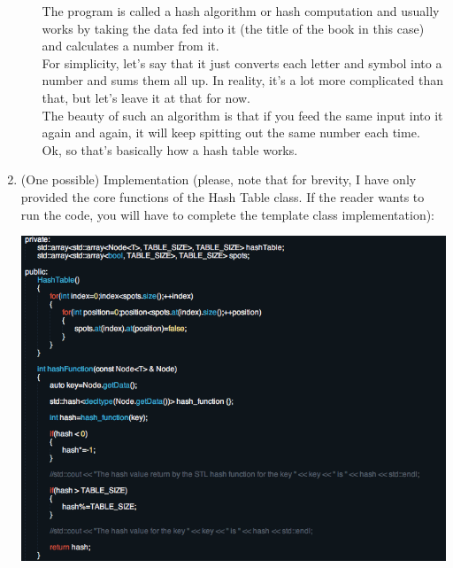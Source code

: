 \documentclass [12pt, executivepaper]{article}
\begin{document}
\begin{enumerate}
\begin{enumerate}
The program is called a hash algorithm or hash computation and usually works by taking the data fed into it (the title of the book in this case) and calculates a number from it.\\

For simplicity, let's say that it just converts each letter and symbol into a number and sums them all up. In reality, it's a lot more complicated than that, but let's leave it at that for now.\\

The beauty of such an algorithm is that if you feed the same input into it again and again, it will keep spitting out the same number each time.\\

Ok, so that's basically how a hash table works.

\end{enumerate}

\item (One possible) Implementation (please, note that for brevity, I have only provided the core functions of the Hash Table class. If the reader wants to run the code, you will have to complete the template class implementation):

\begin{adjustbox}{max height=2in, max width=2in}



\end{adjustbox}

\pagebreak

\vspace*{-40mm}

\includegraphics[scale=0.5]{HashTableHeaderfilePart1}


\end{enumerate}
\end{document}
